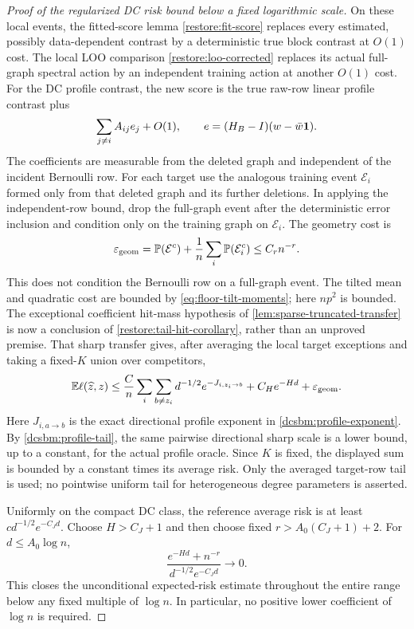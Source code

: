 \begin{proof}[Proof of the regularized DC risk bound below a fixed logarithmic scale]
On these local events, the fitted-score lemma
\cref{restore:fit-score} replaces every estimated, possibly
data-dependent contrast by a deterministic true block contrast at
$O(1)$ cost. The local LOO comparison
\cref{restore:loo-corrected} replaces its actual full-graph spectral
action by an independent training action at another $O(1)$ cost.
For the DC profile contrast, the new score is the true raw-row
linear profile contrast plus
\[
 \sum_{j\ne i}A_{ij}e_j+O(1),\qquad
 e=(H_B-I)(w-\bar w\mathbf 1).
\]
The coefficients are measurable from the deleted graph and independent
of the incident Bernoulli row. For each target use the analogous
training event $\mathcal E_i$ formed only from that deleted graph and
its further deletions. In applying the independent-row bound,
drop the full-graph event after the deterministic error inclusion and
condition only on the training graph on $\mathcal E_i$.
The geometry cost is
\[
 \varepsilon_{\rm geom}
 =\mathbb P(\mathcal E^c)+\frac1n\sum_i\mathbb P(\mathcal E_i^c)
 \le C_rn^{-r}.
\]
This does not condition the Bernoulli row on a full-graph event.
The tilted mean and quadratic cost are
bounded by \eqref{eq:floor-tilt-moments}; here $np^2$ is bounded.
The exceptional coefficient hit-mass hypothesis of
\cref{lem:sparse-truncated-transfer} is now a conclusion of
\cref{restore:tail-hit-corollary}, rather than an unproved premise. That sharp
transfer gives, after averaging the local target exceptions and taking
a fixed-$K$ union over competitors,
\[
 \mathbb E\ell(\widehat z,z)
 \le \frac Cn\sum_i\sum_{b\ne z_i}
                  d^{-1/2}e^{-J_{i,z_i\to b}}
       +C_He^{-Hd}+\varepsilon_{\rm geom}.
\]
Here $J_{i,a\to b}$ is the exact directional profile exponent in
\eqref{dcsbm:profile-exponent}. By \cref{dcsbm:profile-tail}, the same
pairwise directional sharp scale is a lower bound, up to a constant,
for the actual profile oracle. Since $K$ is fixed, the
displayed sum is bounded by a constant times its average risk.
Only the averaged target-row tail is used; no pointwise uniform tail
for heterogeneous degree parameters is asserted.

Uniformly on the compact DC class, the reference average risk is at
least $c d^{-1/2}e^{-C_Jd}$. Choose $H>C_J+1$ and then choose fixed
$r>A_0(C_J+1)+2$. For $d\le A_0\log n$,
\[
 \frac{e^{-Hd}+n^{-r}}{d^{-1/2}e^{-C_Jd}}\longrightarrow0.
\]
This closes the unconditional expected-risk estimate throughout the
entire range below any fixed multiple of $\log n$. In particular, no
positive lower coefficient of $\log n$ is required.
\end{proof}

